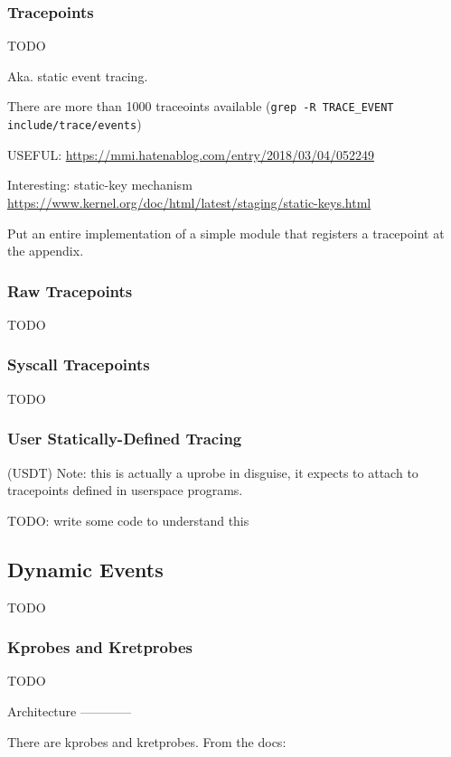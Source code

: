 \subsubsection*{Tracepoints}

TODO

Aka. static event tracing.

There are more than 1000 traceoints available (\verb|grep -R TRACE_EVENT include/trace/events|)

USEFUL: \url{https://mmi.hatenablog.com/entry/2018/03/04/052249}

Interesting: static-key mechanism
\url{https://www.kernel.org/doc/html/latest/staging/static-keys.html}

Put an entire implementation of a simple module that registers a
tracepoint at the appendix.

\subsubsection*{Raw Tracepoints}

TODO

\subsubsection*{Syscall Tracepoints}

TODO

\subsubsection*{User Statically-Defined Tracing}

(USDT)
Note: this is actually a uprobe in disguise, it expects to attach to
tracepoints defined in userspace programs.

TODO: write some code to understand this

\subsection{Dynamic Events}

TODO

\subsubsection*{Kprobes and Kretprobes}

TODO


Architecture
------------

There are kprobes and kretprobes. From the docs:

